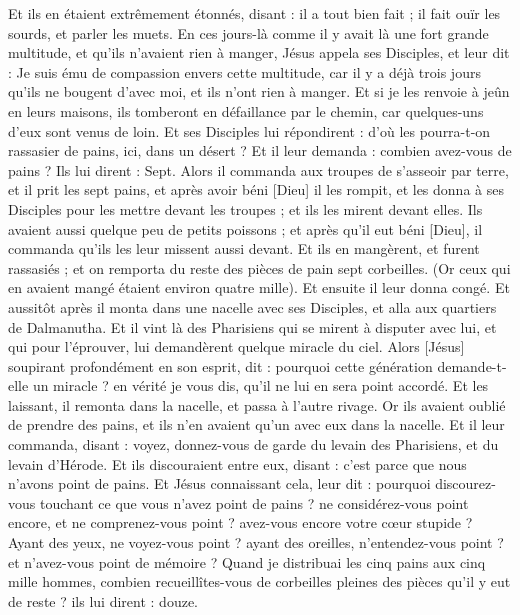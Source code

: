 \begin{multicols}{2}
Et ils en étaient extrêmement étonnés, disant : il a tout bien fait ; il fait ouïr les sourds, et parler les muets.
\VerseOne{}En ces jours-là comme il y avait là une fort grande multitude, et qu'ils n'avaient rien à manger, Jésus appela ses Disciples, et leur dit :
Je suis ému de compassion envers cette multitude, car il y a déjà trois jours qu'ils ne bougent d'avec moi, et ils n'ont rien à manger.
Et si je les renvoie à jeûn en leurs maisons, ils tomberont en défaillance par le chemin, car quelques-uns d'eux sont venus de loin.
Et ses Disciples lui répondirent : d'où les pourra-t-on rassasier de pains, ici, dans un désert ?
Et il leur demanda : combien avez-vous de pains ? Ils lui dirent : Sept.
Alors il commanda aux troupes de s'asseoir par terre, et il prit les sept pains, et après avoir béni [Dieu] il les rompit, et les donna à ses Disciples pour les mettre devant les troupes ; et ils les mirent devant elles.
Ils avaient aussi quelque peu de petits poissons ; et après qu'il eut béni [Dieu], il commanda qu'ils les leur missent aussi devant.
Et ils en mangèrent, et furent rassasiés ; et on remporta du reste des pièces de pain sept corbeilles.
(Or ceux qui en avaient mangé étaient environ quatre mille). Et ensuite il leur donna congé.
Et aussitôt après il monta dans une nacelle avec ses Disciples, et alla aux quartiers de Dalmanutha.
Et il vint là des Pharisiens qui se mirent à disputer avec lui, et qui pour l'éprouver, lui demandèrent quelque miracle du ciel.
Alors [Jésus] soupirant profondément en son esprit, dit : pourquoi cette génération demande-t-elle un miracle ? en vérité je vous dis, qu'il ne lui en sera point accordé.
Et les laissant, il remonta dans la nacelle, et passa à l'autre rivage.
Or ils avaient oublié de prendre des pains, et ils n'en avaient qu'un avec eux dans la nacelle.
Et il leur commanda, disant : voyez, donnez-vous de garde du levain des Pharisiens, et du levain d'Hérode.
Et ils discouraient entre eux, disant : c'est parce que nous n'avons point de pains.
Et Jésus connaissant cela, leur dit : pourquoi discourez-vous touchant ce que vous n'avez point de pains ? ne considérez-vous point encore, et ne comprenez-vous point ? avez-vous encore votre cœur stupide ?
Ayant des yeux, ne voyez-vous point ? ayant des oreilles, n'entendez-vous point ? et n'avez-vous point de mémoire ?
Quand je distribuai les cinq pains aux cinq mille hommes, combien recueillîtes-vous de corbeilles pleines des pièces qu'il y eut de reste ? ils lui dirent : douze.

\end{multicols}
